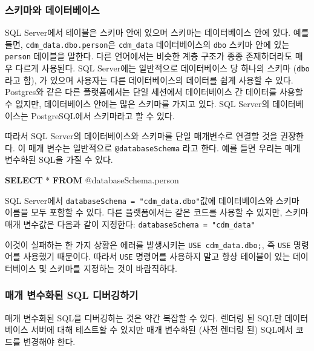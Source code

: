 \documentclass[10.5pt]{book}
\newenvironment{Shaded}{\begin{snugshade}}{\end{snugshade}}
\newcommand{\KeywordTok}[1]{\textcolor[rgb]{0.13,0.29,0.53}{\textbf{#1}}}
\newcommand{\NormalTok}[1]{#1}
\theoremstyle{definition}
\theoremstyle{definition}
\theoremstyle{definition}
\theoremstyle{remark}
\begin{document}
\subsubsection*{스키마와 데이터베이스}\label{-}

SQL Server에서 테이블은 스키마 안에 있으며 스키마는 데이터베이스 안에
있다. 예를 들면, \texttt{cdm\_data.dbo.person}은 \texttt{cdm\_data}
데이터베이스의 \texttt{dbo} 스키마 안에 있는 \texttt{person} 테이블을
말한다. 다른 언어에서는 비슷한 계층 구조가 종종 존재하더라도 매우 다르게
사용된다. SQL Server에는 일반적으로 데이터베이스 당 하나의 스키마
(\texttt{dbo}라고 함), 가 있으며 사용자는 다른 데이터베이스의 데이터를
쉽게 사용할 수 있다. Postgres와 같은 다른 플랫폼에서는 단일 세션에서
데이터베이스 간 데이터를 사용할 수 없지만, 데이터베이스 안에는 많은
스키마를 가지고 있다. SQL Server의 데이터베이스는 PostgreSQL에서
스키마라고 할 수 있다.

따라서 SQL Server의 데이터베이스와 스키마를 단일 매개변수로 연결할 것을
권장한다. 이 매개 변수는 일반적으로 \texttt{@databaseSchema} 라고 한다.
예를 들면 우리는 매개 변수화된 SQL을 가질 수 있다.

\begin{Shaded}
\begin{Highlighting}[]
\KeywordTok{SELECT}\NormalTok{ * }\KeywordTok{FROM}\NormalTok{ @databaseSchema.person}
\end{Highlighting}
\end{Shaded}

SQL Server에서 \texttt{databaseSchema\ =\ "cdm\_data.dbo"}값에
데이터베이스와 스키마 이름을 모두 포함할 수 있다. 다른 플랫폼에서는 같은
코드를 사용할 수 있지만, 스키마 매개 변수값은 다음과 같이 지정한다:
\texttt{databaseSchema\ =\ "cdm\_data"}

이것이 실패하는 한 가지 상황은 에러를 발생시키는
\texttt{USE\ cdm\_data.dbo;}, 즉 \texttt{USE} 명령어를 사용했기
때문이다. 따라서 \texttt{USE} 명령어를 사용하지 말고 항상 테이블이 있는
데이터베이스 및 스키마를 지정하는 것이 바람직하다.

\subsubsection*{매개 변수화된 SQL 디버깅하기}\label{--sql-}

매개 변수화된 SQL을 디버깅하는 것은 약간 복잡할 수 있다. 렌더링 된 SQL만
데이터베이스 서버에 대해 테스트할 수 있지만 매개 변수화된 (사전 렌더링
된) SQL에서 코드를 변경해야 한다. 
\end{document}
